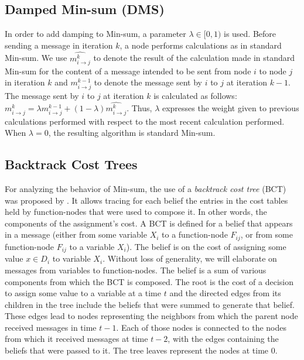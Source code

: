 \subsection{Damped Min-sum (DMS)}
In order to add damping to Min-sum, a parameter $\lambda \in [0,1)$ is used. Before sending a message in iteration $k$, a node performs calculations as in standard Min-sum. We use $\widehat{m^k_{i \rightarrow j}}$ to denote the result of the calculation made in standard Min-sum for the content of a message intended to be sent from node $i$ to node $j$ in iteration $k$ and $m^{k-1}_{i \rightarrow j}$ to denote the message sent by $i$ to $j$ at iteration $k-1$. The message sent by $i$ to $j$ at iteration $k$ is calculated as follows:
$m^{k}_{i \rightarrow j} = \lambda m^{k-1}_{i \rightarrow j} + (1 - \lambda) \widehat{m^k_{i \rightarrow j}}$.
Thus, $\lambda$ expresses the weight given to previous calculations performed with respect to the most recent calculation performed. When $\lambda = 0$, the resulting algorithm is standard Min-sum.
\subsection{Backtrack Cost Trees}
\label{sec:bct}
	For analyzing the behavior of Min-sum, the use of a {\em backtrack cost tree} (BCT) was proposed by \citet{ZivanLG20}. It allows tracing for each belief the entries in the cost tables held by function-nodes that were used to compose it. In other words, the components of the assignment's cost.
A BCT is defined for a belief that appears in a message (either from some variable $X_{i}$ to a function-node $F_{ij}$, or from some function-node $F_{ij}$ to a variable $X_{i}$). The belief is on the cost of assigning some value $x\in D_{i}$ to variable $X_{i}$. Without loss of generality, we will elaborate on messages from variables to function-nodes.
The belief is a sum of various components from which the BCT is composed. The root is the cost of a decision to assign some value to a variable at a time $t$ and the directed edges from its children in the tree include the beliefs that were summed to generate that belief. These edges lead to nodes representing the neighbors from which the parent node received messages in time $t-1$. Each of those nodes is connected to the nodes from which it received messages at time $t-2$, with the edges containing the beliefs that were passed to it. The tree leaves represent the nodes at time $0$.
